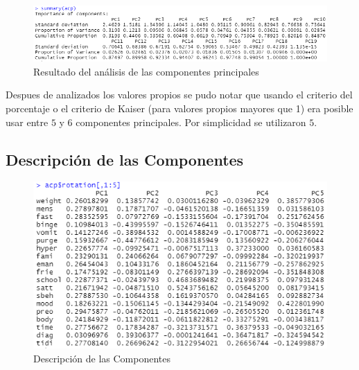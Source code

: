 \documentclass[a4paper,10pt,twocolumn]{article}
\begin{document}
	\begin{figure}[htb]%
		\begin{center}
			\includegraphics[width=\linewidth]{acp}
		\end{center}
		\caption{Resultado del análisis de las componentes principales \label{fig:acp}}%
	\end{figure}
	
	Despues de analizados los valores propios se pudo notar que usando el criterio del porcentaje o el criterio de Kaiser (para valores propios mayores que 1) era posible usar entre $5$ y $6$ componentes principales. Por simplicidad se utilizaron $5$.
	
	\subsection{Descripción de las Componentes}\label{sec:desc_comp}
	
	\begin{figure}[htb]%
		\begin{center}
			\includegraphics[width=\linewidth]{rotation}
		\end{center}
		\caption{Descripción de las Componentes \label{fig:rotation}}%
	\end{figure}
	
\end{document}
